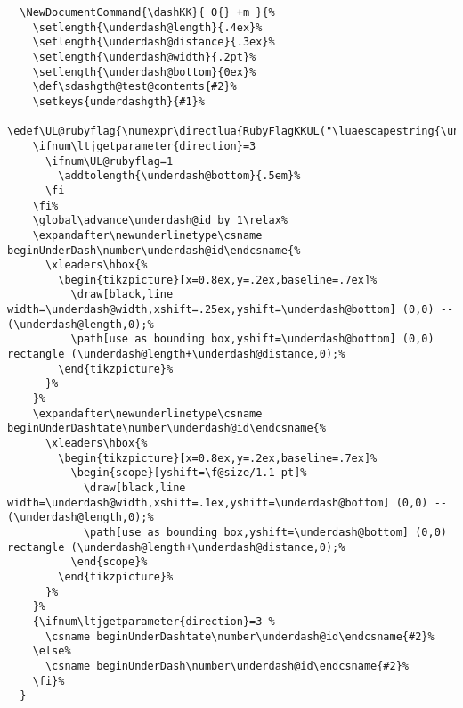 \documentclass[luatex,fontsize=8pt,paper=b5,twoside]{jlreq}%
\begin{document}
\begin{lstlisting}
  \NewDocumentCommand{\dashKK}{ O{} +m }{%
    \setlength{\underdash@length}{.4ex}%
    \setlength{\underdash@distance}{.3ex}%
    \setlength{\underdash@width}{.2pt}%
    \setlength{\underdash@bottom}{0ex}%
    \def\sdashgth@test@contents{#2}%
    \setkeys{underdashgth}{#1}%
    \edef\UL@rubyflag{\numexpr\directlua{RubyFlagKKUL("\luaescapestring{\unexpanded\expandafter{\sdashgth@test@contents}}")}\relax}%
    \ifnum\ltjgetparameter{direction}=3
      \ifnum\UL@rubyflag=1
        \addtolength{\underdash@bottom}{.5em}%
      \fi
    \fi%
    \global\advance\underdash@id by 1\relax%
    \expandafter\newunderlinetype\csname beginUnderDash\number\underdash@id\endcsname{%
      \xleaders\hbox{%
        \begin{tikzpicture}[x=0.8ex,y=.2ex,baseline=.7ex]%
          \draw[black,line width=\underdash@width,xshift=.25ex,yshift=\underdash@bottom] (0,0) -- (\underdash@length,0);%
          \path[use as bounding box,yshift=\underdash@bottom] (0,0) rectangle (\underdash@length+\underdash@distance,0);%
        \end{tikzpicture}%
      }%
    }%
    \expandafter\newunderlinetype\csname beginUnderDashtate\number\underdash@id\endcsname{%
      \xleaders\hbox{%
        \begin{tikzpicture}[x=0.8ex,y=.2ex,baseline=.7ex]%
          \begin{scope}[yshift=\f@size/1.1 pt]%
            \draw[black,line width=\underdash@width,xshift=.1ex,yshift=\underdash@bottom] (0,0) -- (\underdash@length,0);%
            \path[use as bounding box,yshift=\underdash@bottom] (0,0) rectangle (\underdash@length+\underdash@distance,0);%
          \end{scope}%
        \end{tikzpicture}%
      }%
    }%
    {\ifnum\ltjgetparameter{direction}=3 %
      \csname beginUnderDashtate\number\underdash@id\endcsname{#2}%
    \else%
      \csname beginUnderDash\number\underdash@id\endcsname{#2}%
    \fi}%
  }


\end{lstlisting}
\end{document}
